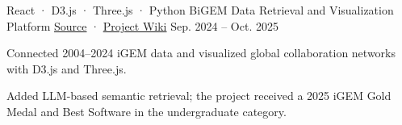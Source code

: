 \begin{cventries}
\vspace{0.8cm} %
  \cventry
    {React · D3.js · Three.js · Python}
    {BiGEM Data Retrieval and Visualization Platform}
    {\href{https://gitlab.igem.org/2025/software-tools/bit-china}{Source} · \href{https://2025.igem.wiki/bit-china/software}{Project Wiki}}
    {Sep. 2024 -- Oct. 2025}
    {
      \begin{cvitems}
        \item {Connected 2004--2024 iGEM data and visualized global collaboration networks with D3.js and Three.js.}
        \item {Added LLM-based semantic retrieval; the project received a 2025 iGEM Gold Medal and Best Software in the undergraduate category.}
      \end{cvitems}
    }

\end{cventries}
